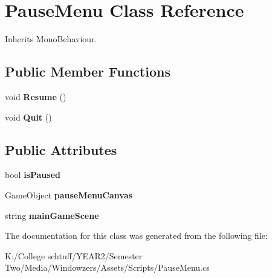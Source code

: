 \hypertarget{class_pause_menu}{}\section{Pause\+Menu Class Reference}
\label{class_pause_menu}


Inherits Mono\+Behaviour.

\subsection*{Public Member Functions}
\begin{DoxyCompactItemize}
\item 
\mbox{\label{class_pause_menu_a4416b25e65dfadf57cd8657eaf94f7df}} 
void {\bfseries Resume} ()
\item 
\mbox{\label{class_pause_menu_a7770b476b14f21017ab0da8bfdd13f4d}} 
void {\bfseries Quit} ()
\end{DoxyCompactItemize}
\subsection*{Public Attributes}
\begin{DoxyCompactItemize}
\item 
\mbox{\label{class_pause_menu_a3d0a43917cf3e488852b47d1b755b377}} 
bool {\bfseries is\+Paused}
\item 
\mbox{\label{class_pause_menu_ae42f80ec5ec1a30261da3a9f9e6f13c4}} 
Game\+Object {\bfseries pause\+Menu\+Canvas}
\item 
\mbox{\label{class_pause_menu_a870178964f31f08e8f12ec44524120a0}} 
string {\bfseries main\+Game\+Scene}
\end{DoxyCompactItemize}


The documentation for this class was generated from the following file\+:\begin{DoxyCompactItemize}
\item 
K\+:/\+College schtuff/\+Y\+E\+A\+R2/\+Semester Two/\+Media/\+Windowzers/\+Assets/\+Scripts/Pause\+Menu.\+cs\end{DoxyCompactItemize}
